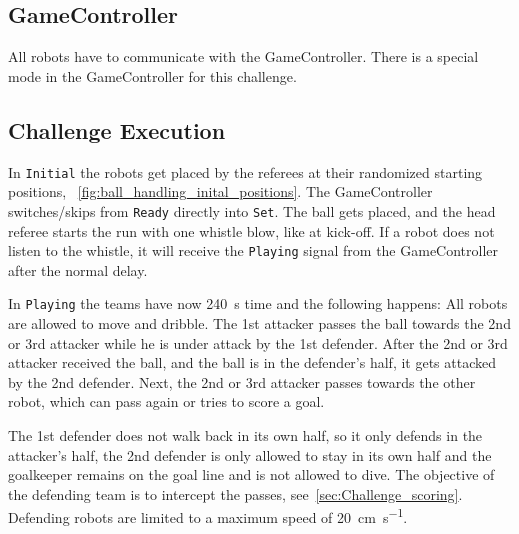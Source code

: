 \subsection{GameController}
All robots have to communicate with the GameController. There is a special mode in the GameController for this challenge. 

\subsection{Challenge Execution}

In \texttt{Initial} the robots get placed by the referees at their randomized starting positions, \cf~\cref{fig:ball_handling_inital_positions}. The GameController switches/skips from \texttt{Ready} directly into \texttt{Set}. The ball gets placed, and the head referee starts the run with one whistle blow, like at kick-off. If a robot does not listen to the whistle, it will receive the \texttt{Playing} signal from the GameController after the normal delay.

In \texttt{Playing} the teams have now \qty{240}{\second} time and the following happens: All robots are allowed to move and dribble. The 1st attacker passes the ball towards the 2nd or 3rd attacker while he is under attack by the 1st defender. After the 2nd or 3rd attacker received the ball, and the ball is in the defender's half, it gets attacked by the 2nd defender. Next, the 2nd or 3rd attacker passes towards the other robot, which can pass again or tries to score a goal.

The 1st defender does not walk back in its own half, so it only defends in the attacker's half, the 2nd defender is only allowed to stay in its own half and the goalkeeper remains on the goal line and is not allowed to dive. The objective of the defending team is to intercept the passes, see~\cref{sec:Challenge_scoring}. Defending robots are limited to a maximum speed of \qty{20}{\cm \per \second}.

